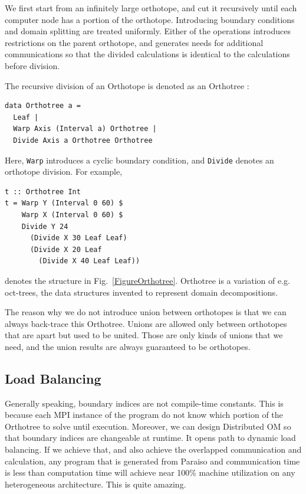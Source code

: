 \documentclass[twocolumn]{article}
\begin{document}
We first start from an infinitely large orthotope, and cut it recursively
until each computer node has a portion of the orthotope. Introducing boundary
conditions and domain splitting are treated uniformly. Either of the
operations introduces restrictions on the parent orthotope, and generates
needs for additional communications so that the divided calculations is
identical to the calculations before division.

The recursive division of an Orthotope is denoted as an Orthotree :
\begin{verbatim}
data Orthotree a = 
  Leaf |
  Warp Axis (Interval a) Orthotree |
  Divide Axis a Orthotree Orthotree
\end{verbatim}

Here, {\tt Warp} introduces a cyclic boundary condition, and {\tt Divide}
denotes an orthotope division. For example,

\begin{verbatim}
t :: Orthotree Int
t = Warp Y (Interval 0 60) $
    Warp X (Interval 0 60) $
    Divide Y 24 
      (Divide X 30 Leaf Leaf)
      (Divide X 20 Leaf
        (Divide X 40 Leaf Leaf))
\end{verbatim}

denotes the structure in Fig.~\ref{FigureOrthotree}. Orthotree is a variation
of e.g. oct-trees, the data structures invented to represent domain
decompositions.

The reason why we do not introduce union between orthotopes is that we can
always back-trace this Orthotree. Unions are allowed only between orthotopes
that are apart but used to be united. Those are only kinds of unions that we
need, and the union results are always guaranteed to be orthotopes.

\subsection{Load Balancing}

Generally speaking, boundary indices are not compile-time constants. This is
because each MPI instance of the program do not know which portion of the
Orthotree to solve until execution. Moreover, we can design Distributed OM so
that boundary indices are changeable at runtime. It opens path to dynamic load
balancing. If we achieve that, and also achieve the overlapped communication
and calculation, any program that is generated from Paraiso and communication
time is less than computation time will achieve near 100\% machine utilization
on any heterogeneous architecture. This is quite amazing.
\end{document}
